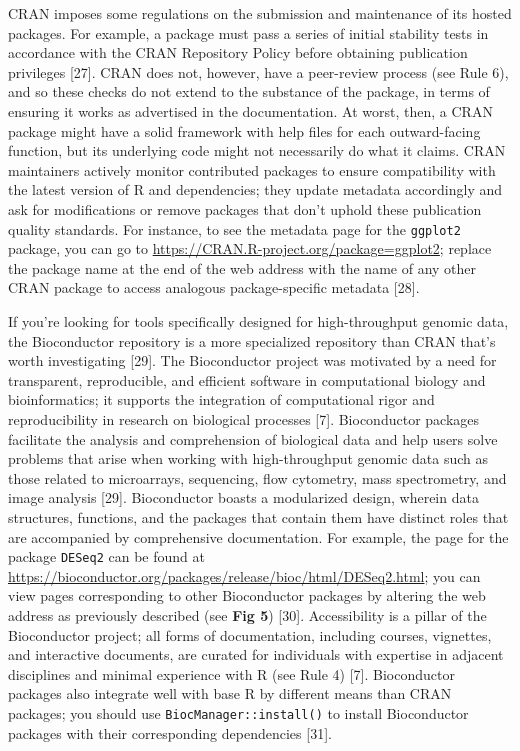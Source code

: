 \documentclass[10pt,letterpaper]{article}
\begin{document}
CRAN imposes some regulations on the submission and maintenance of its
hosted packages. For example, a package must pass a series of initial
stability tests in accordance with the CRAN Repository Policy before
obtaining publication privileges {[}27{]}. CRAN does not, however, have
a peer-review process (see Rule 6), and so these checks do not extend to
the substance of the package, in terms of ensuring it works as
advertised in the documentation. At worst, then, a CRAN package might
have a solid framework with help files for each outward-facing function,
but its underlying code might not necessarily do what it claims. CRAN
maintainers actively monitor contributed packages to ensure
compatibility with the latest version of R and dependencies; they update
metadata accordingly and ask for modifications or remove packages that
don't uphold these publication quality standards. For instance, to see
the metadata page for the \texttt{ggplot2} package, you can go to
\url{https://CRAN.R-project.org/package=ggplot2}; replace the package
name at the end of the web address with the name of any other CRAN
package to access analogous package-specific metadata {[}28{]}.

If you're looking for tools specifically designed for high-throughput
genomic data, the Bioconductor repository is a more specialized
repository than CRAN that's worth investigating {[}29{]}. The
Bioconductor project was motivated by a need for transparent,
reproducible, and efficient software in computational biology and
bioinformatics; it supports the integration of computational rigor and
reproducibility in research on biological processes {[}7{]}.
Bioconductor packages facilitate the analysis and comprehension of
biological data and help users solve problems that arise when working
with high-throughput genomic data such as those related to microarrays,
sequencing, flow cytometry, mass spectrometry, and image analysis
{[}29{]}. Bioconductor boasts a modularized design, wherein data
structures, functions, and the packages that contain them have distinct
roles that are accompanied by comprehensive documentation. For example,
the page for the package \texttt{DESeq2} can be found at
\url{https://bioconductor.org/packages/release/bioc/html/DESeq2.html};
you can view pages corresponding to other Bioconductor packages by
altering the web address as previously described (see \textbf{Fig 5})
{[}30{]}. Accessibility is a pillar of the Bioconductor project; all
forms of documentation, including courses, vignettes, and interactive
documents, are curated for individuals with expertise in adjacent
disciplines and minimal experience with R (see Rule 4) {[}7{]}.
Bioconductor packages also integrate well with base R by different means
than CRAN packages; you should use \texttt{BiocManager::install()} to
install Bioconductor packages with their corresponding dependencies
{[}31{]}.
\end{document}
